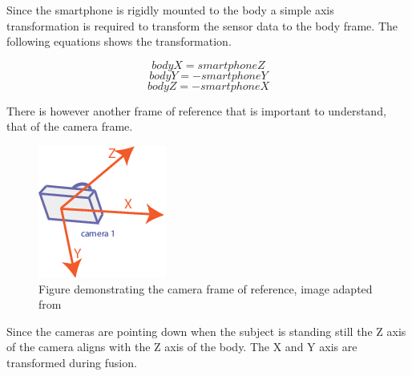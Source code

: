 Since the smartphone is rigidly mounted to the body a simple axis transformation is required to transform the sensor data to the body frame. The following equations shows the transformation.

$$ bodyX = smartphoneZ  $$
$$ bodyY = -smartphoneY  $$
$$ bodyZ = -smartphoneX  $$

There is however another frame of reference that is important to understand, that of the camera frame.

\begin{figure}[!ht] 
\captionsetup{width=0.8\linewidth, font=small}  
\includegraphics[width=0.5\linewidth]{figures/cf.png}
\caption{Figure demonstrating the camera frame of reference, image adapted from \cite{matlab}}
\label{fig:cf}
\end{figure}

Since the cameras are pointing down when the subject is standing still the Z axis of the camera aligns with the Z axis of the body. The X and Y axis are transformed during fusion.














